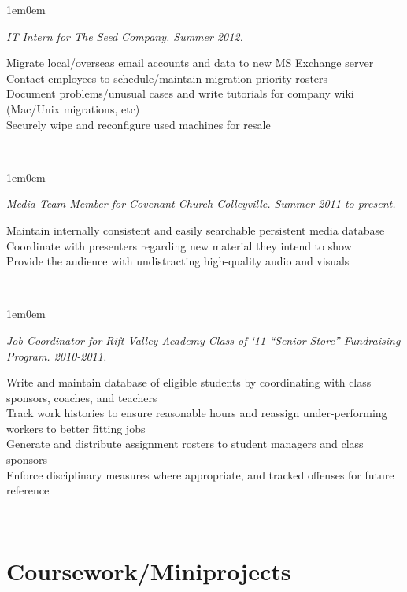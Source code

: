 \documentclass[10pt,letterpaper, full]{article}
\newcommand{\pjtitle}[1]{\renewcommand{\givenpjtitle}{#1}}
\newcommand{\pjtime}[1]{\renewcommand{\givenpjtime}{#1}}
\newcommand{\pjbody}[1]{\renewcommand{\givenpjbody}{#1}}
\newcommand{\givenpjtitle}{REQUIRED!}
\newcommand{\givenpjtime}{REQUIRED!}
\newcommand{\givenpjbody}{REQUIRED!}
\newenvironment{projectenv}
    {
        \begin{adjustwidth}{1em}{0em}
    }
    {
        \textit{\givenpjtitle. \givenpjtime.}

        \begin{minipage}[l]{\textwidth}
            \givenpjbody%
        \end{minipage}\\%


        \end{adjustwidth}
    }
\begin{document}
\begin{projectenv}%
    \pjtitle{IT Intern for The Seed Company}
    \pjtime{Summer 2012}
    \pjbody{
        Migrate local/overseas email accounts and data to new MS Exchange server\\
        Contact employees to schedule/maintain migration priority rosters\\
        Document problems/unusual cases and write tutorials for company wiki (Mac/Unix migrations, etc)\\
        Securely wipe and reconfigure used machines for resale\\
    }
\end{projectenv}%

\begin{projectenv}%
    \pjtitle{Media Team Member for Covenant Church Colleyville}
    \pjtime{Summer 2011 to present}
    \pjbody{
        Maintain internally consistent and easily searchable persistent media database\\
        Coordinate with presenters regarding new material they intend to show\\
        Provide the audience with undistracting high-quality audio and visuals\\
    }
\end{projectenv}%

\begin{projectenv}%
    \pjtitle{Job Coordinator for Rift Valley Academy Class of ‘11 “Senior Store” Fundraising Program}
    \pjtime{2010-2011}
    \pjbody{
        Write and maintain database of eligible students by coordinating with class sponsors, coaches, and teachers\\
        Track work histories to ensure reasonable hours and reassign under-performing workers to better fitting jobs\\
        Generate and distribute assignment rosters to student managers and class sponsors\\
        Enforce disciplinary measures where appropriate, and tracked offenses for future reference\\
    }
\end{projectenv}%



\section{Coursework/Miniprojects}
\end{document}
